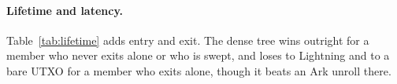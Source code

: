
\paragraph{Lifetime and latency.} Table~\ref{tab:lifetime} adds entry and
exit. The dense tree wins outright for a member who never exits alone or
who is swept, and loses to Lightning and to a bare UTXO for a member who
exits alone, though it beats an Ark unroll there.
